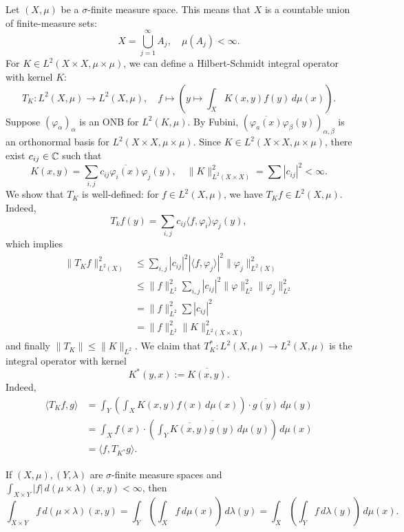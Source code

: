 Let $(X, \mu)$ be a $\sigma$-finite measure space.
This means that $X$ is a countable union of finite-measure sets:
$$X = \bigcup_{j = 1} ^\infty A_j,\quad \mu(A_j) < \infty.$$
For $K \in L^2 (X \times X, \mu \times \mu)$, we can define a Hilbert-Schmidt integral operator 
with kernel $K$:
$$T_K : L^2 (X, \mu) \to L^2 (X, \mu),\quad f \mapsto \left(y \mapsto \int_X K(x, y) f(y)\, d\mu (x)\right).$$
Suppose $(\varphi_\alpha)_{\alpha}$ is an ONB for $L^2 (K, \mu)$.
By Fubini, $\left(\overline{\varphi_a (x)} \varphi_\beta (y)\right)_{\alpha, \beta}$
is an orthonormal basis for $L^2 (X \times X, \mu \times \mu)$.
Since $K \in L^2 (X \times X, \mu \times \mu)$, there exist $c_{ij} \in \mathbb {C}$ such that 
$$K(x, y) = \sum_{i,j} c_{ij} \overline{\varphi_i (x)} \varphi_j (y),\quad \| K\|^2 _{L^2 (X \times X)} = \sum |c_{ij}|^2 < \infty.$$
We show that $T_K$ is well-defined: for $f \in L^2 (X, \mu)$, we have $T_K f \in L^2 (X,\mu)$.
Indeed,
$$T_k f (y) = \sum_{i, j} c_{ij} \langle f, \varphi_i \rangle \varphi_j (y),$$
which implies 
\begin{align*}
  \| T_K f\|_{L^2 (X)} ^2 &\leq \sum_{i, j} |c_{ij}|^2 |\langle f, \varphi_j\rangle|^2 \| \varphi_j\|^2 _{L^2 (X)}\\
  &\leq \| f\|_{L^2} ^2 \sum_{i, j} |c_{ij}|^2 \| \varphi\|^2 _{L^2} \| \varphi_j\|^2 _{L^2}\\
  &= \| f\|^2 _{L^2} \sum|c_{ij}|^2\\
  &= \| f\|^2 _{L^2} \|K\|^2 _{L^2 (X \times X)}
\end{align*}
and finally $\| T_K\| \leq \|K\|_{L^2}$.
We claim that $T_K ^* : L^2 (X, \mu) \to L^2 (X, \mu)$ is the integral operator with kernel 
$$K^* (y, x) := \overline{K(x, y)}.$$
Indeed, 
\begin{align*}
  \langle T_K f, g \rangle &= \int_Y \left(\int_X K(x, y) f(x) \, d\mu (x)\right) \cdot \overline{g(y)}\, d\mu (y)\\
  &= \int_X f(x) \cdot \left(\overline{\int_Y \overline{K(x, y)} g(y)\, d\mu(y)}\right)\, d\mu (x)\\ 
  &= \langle f, T_{K^*} g \rangle.
\end{align*}

\begin{remark}
  If $(X, \mu), (Y,\lambda)$ are $\sigma$-finite measure spaces and $\int_{X \times Y} |f|\, d(\mu \times \lambda) (x, y) < \infty$, then 
  $$\int_{X \times Y} f \, d(\mu \times \lambda)(x, y)= \int_Y \left(\int_X f\, d\mu(x)\right)\, d\lambda(y) = \int_X \left(\int_Y f\, d\lambda(y)\right)\, d\mu(x).$$
\end{remark}

